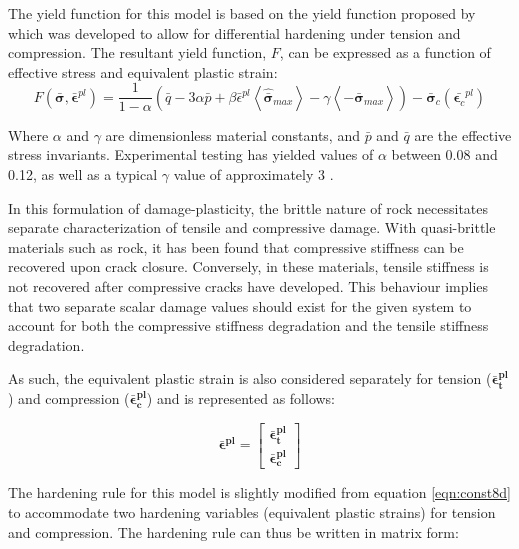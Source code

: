 The yield function for this model is based on the yield function proposed by \citet{lee_plastic-damage_1998} which was developed to allow for differential hardening under tension and compression. The resultant yield function, $F$, can be expressed as a function of effective stress and equivalent plastic strain:
\begin{equation}
    F
    \left(
        \boldsymbol{\bar{\sigma}},\bar{\boldsymbol{\epsilon}}^{pl}
    \right)
    =
    \frac{1}{1-\alpha}
    \left(
        \bar{q}-3\alpha\bar{p}+\beta\bar{\epsilon}^{pl}
        \left\langle\hat{\bar{\boldsymbol{\sigma}}}_{max}\right\rangle-\gamma\left\langle-\hat{\bar{\boldsymbol{\sigma}}}_{max}\right\rangle\right)
    -\bar{\boldsymbol{\sigma}}_{c}
    \left(
        \bar{\boldsymbol{\epsilon}_{c}}^{pl}
    \right)
\label{eqn:const10}
\end{equation}

Where $\alpha$ and $\gamma$ are dimensionless material constants, and $\bar{p}$ and $\bar{q}$ are the effective stress invariants. Experimental testing has yielded values of $\alpha$ between 0.08 and 0.12, as well as a typical $\gamma$ value of approximately 3 \cite{lubliner_plastic-damage_1989}. 

In this formulation of damage-plasticity, the brittle nature of rock
necessitates separate characterization of tensile and compressive
damage. With quasi-brittle materials such as rock, it has been found that compressive stiffness can be recovered upon crack closure. Conversely, in these materials, tensile stiffness is not recovered after compressive cracks have developed. This behaviour implies that two separate scalar damage values should exist for the given system to account for both the compressive stiffness degradation and the tensile stiffness degradation. 

As such, the equivalent plastic strain is also considered separately for tension ($\boldsymbol{\bar{\epsilon}_{t}^{pl}}$) and compression ($\boldsymbol{\bar{\epsilon}_{c}^{pl}}$) and is represented as follows: 

\begin{equation}
\boldsymbol{\bar{\epsilon}^{pl}}=
\left[
\begin{array}{c}
    \boldsymbol{\bar{\epsilon}_{t}^{pl}}\\
    \boldsymbol{\bar{\epsilon}_{c}^{pl}}
\end{array}
\right]
\label{eqn:const9}
\end{equation}


The hardening rule for this model is slightly modified from equation \ref{eqn:const8d} to accommodate two hardening variables (equivalent plastic strains) for tension and compression. The hardening rule can thus be written in matrix form:

